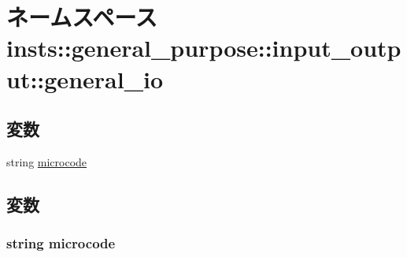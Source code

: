 \hypertarget{namespaceinsts_1_1general__purpose_1_1input__output_1_1general__io}{
\section{ネームスペース insts::general\_\-purpose::input\_\-output::general\_\-io}
\label{namespaceinsts_1_1general__purpose_1_1input__output_1_1general__io}
}
\subsection*{変数}
\begin{DoxyCompactItemize}
\item 
string \hyperlink{namespaceinsts_1_1general__purpose_1_1input__output_1_1general__io_a770f11a173e99389a8802f0107ed8f52}{microcode}
\end{DoxyCompactItemize}


\subsection{変数}
\hypertarget{namespaceinsts_1_1general__purpose_1_1input__output_1_1general__io_a770f11a173e99389a8802f0107ed8f52}{
\subsubsection[{microcode}]{\setlength{\rightskip}{0pt plus 5cm}string {\bf microcode}}}
\label{namespaceinsts_1_1general__purpose_1_1input__output_1_1general__io_a770f11a173e99389a8802f0107ed8f52}
